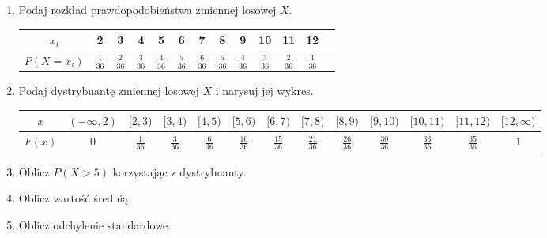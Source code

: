 \documentclass[twoside]{mwart}
\newcommand{\ans}[1]{}
\newenvironment{ansenv}{\comment}{\endcomment}
\newenvironment{ansenv}{\paragraph{Odpowiedź:}}{}
\newcommand{\ans}[1]{\begin{ansenv}#1\end{ansenv}}
\begin{document}
\begin{enumerate}
\begin{enumerate}
{}
\item Podaj rozkład prawdopodobieństwa zmiennej losowej $X$. 
\begin{ansenv}
	\begin{tabular}{c|cccccccccccc}
		$x_i$ & 2 & 3 & 4 & 5 & 6 & 7 & 8 & 9 & 10 & 11 & 12 \\
		\hline
		$P(X=x_i)$ & $\frac{1}{36}$ & $\frac{2}{36}$ & $\frac{3}{36}$ & $\frac{4}{36}$ & $\frac{5}{36}$ & $\frac{6}{36}$ & $\frac{5}{36}$ & $\frac{4}{36}$ & $\frac{3}{36}$ & $\frac{2}{36}$ & $\frac{1}{36}$ \\
	\end{tabular}
\end{ansenv}
\item Podaj dystrybuantę zmiennej losowej $X$ i narysuj jej wykres.
\begin{ansenv}
	\begin{tabular}{c|cccccccccccc}
	$x$ & $\left(-\infty, 2\right)$ & $[2, 3)$ & $[3, 4)$ & $[4, 5)$ & $[5, 6)$ &	
	 $[6, 7)$ & $[7, 8)$ & $[8, 9)$ & $[9, 10)$ & $[10, 11)$ & $[11, 12)$ & $[12, \infty)$ \\
	 \hline
	$F(x)$ & 0 & $\frac{1}{36}$ & $\frac{3}{36}$ & $\frac{6}{36}$ & $\frac{10}{36}$ & $\frac{15}{36}$ & $\frac{21}{36}$ & $\frac{26}{36}$ & $\frac{30}{36}$ & $\frac{33}{36}$ & $\frac{35}{36}$ & $1$ \\
\end{tabular}
\end{ansenv}
\item Oblicz $P(X>5)$ korzystając z dystrybuanty.
\ans{\[ P(X>5)=1-P(X\leq 5)=1-F(5)=1-\frac{10}{36}=\frac{26}{36} \]}
\item Oblicz wartość średnią. \ans{
	\[ EX = \sum_{x_i} x_iP(X=x_i) = 2\cdot\frac{1}{36} + 3\cdot\frac{2}{36} + 4\cdot\frac{3}{36} + 5\cdot\frac{4}{36} + 6\cdot\frac{5}{36} + 7\cdot\frac{6}{36} + 8\cdot\frac{5}{36} + 9\cdot\frac{4}{36} + 10\cdot\frac{3}{36} + 11\cdot\frac{2}{36} + 12\cdot\frac{1}{36} = 7
	\]
}
\item Oblicz odchylenie standardowe. \ans{
	\[ EX^2 = 2^2\cdot\frac{1}{36} + 3^2\cdot\frac{2}{36} + 4^2\cdot\frac{3}{36} + 5^2\cdot\frac{4}{36} + 6^2\cdot\frac{5}{36} + 7^2\cdot\frac{6}{36} + 8^2\cdot\frac{5}{36} + 9^2\cdot\frac{4}{36} + 10^2\cdot\frac{3}{36} + 11^2\cdot\frac{2}{36} + 12^2\cdot\frac{1}{36} = \frac{1974}{36} \]
	
}
\end{enumerate}
\end{enumerate}
\end{document}
